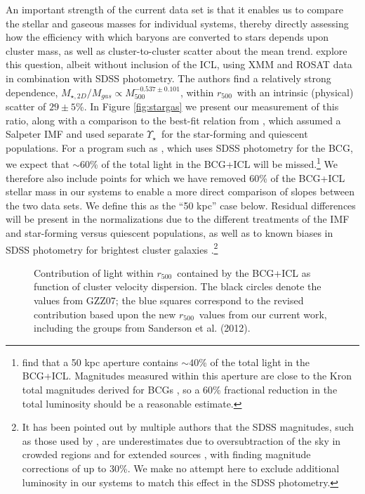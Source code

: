 \documentclass[preprint]{emulateapj}
\newcommand\rfive{$r_{500}$}
\newcommand\ptwo{GZZ07}
\newcommand{\mlrat}{$\Upsilon_\star$}
\begin{document}
An important strength of the current data set is that it enables us to
compare the stellar and gaseous masses for individual systems, thereby
directly assessing how the efficiency with which baryons are converted
to stars depends upon cluster mass, as well as cluster-to-cluster
scatter about the mean trend. \citet{zhang2011} %
explore this question, albeit without inclusion of the ICL, using XMM
and ROSAT data in combination with SDSS photometry. The authors find a
relatively strong dependence, $M_{\star,2D}/M_{gas}\propto
M_{500}^{-0.537\pm0.101}$, within \rfive\ with an intrinsic (physical)
scatter of
$29\pm5$\%. In Figure \ref{fig:stargas} we present our measurement of
this ratio, along with a comparison to the best-fit relation from
\citet{zhang2011}, which assumed a Salpeter IMF and used separate
\mlrat\ for the star-forming and quiescent populations. For a program such
as \citet{zhang2011}, which uses SDSS photometry for the BCG, we
expect that $\sim60$\% of the total light in the BCG+ICL will be
missed.{\footnote{ \citet{gonzalez2005} find that a 50 kpc aperture
    contains $\sim40$\% of the total light in the BCG+ICL. Magnitudes
    measured within this aperture are close to the Kron total
    magnitudes derived for BCGs \citep[e.g.,][found consistency to
    within 0.05 mag]{stott2010}, so a 60\% fractional reduction in the
    total luminosity should be a reasonable estimate.}}  We therefore
also include points for which we have removed 60\% of the BCG+ICL
stellar mass in our systems to enable a more direct comparison of
slopes between the two data sets. We define this as the ``50 kpc''
case below.  Residual differences will be present in the
normalizations due to the different treatments of the IMF and star-forming
versus quiescent populations, as well as to known biases in SDSS
photometry for brightest cluster galaxies
\citep{lauer2007,bernardi2007,hyde2009}.{\footnote{It has been pointed
    out by multiple authors that the SDSS magnitudes, such as those
    used by \citet{zhang2011}, are underestimates due to
    oversubtraction of the sky in crowded regions and for extended
    sources \citep{lauer2007,bernardi2007,hyde2009}, with
    \citet{hyde2009} finding magnitude corrections of up to 30\%. We
    make no attempt here to exclude additional luminosity in our
    systems to match this effect in the SDSS photometry.}}

\begin{figure}
\caption{Contribution of light within \rfive\ contained by the BCG+ICL as function of cluster velocity dispersion. The black circles denote the values from \ptwo; the blue squares correspond to the revised contribution based upon the new \rfive\ values from our current work, including the groups from Sanderson et al. (2012).}
\label{fig:bcgiclvd}
\end{figure}
\end{document}
